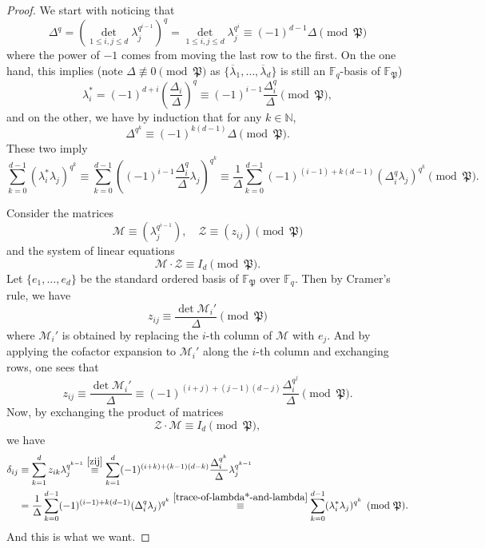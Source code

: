 \documentclass[11pt]{amsart}
\theoremstyle{plain}
\theoremstyle{definition}
\theoremstyle{remark}
\numberwithin{equation}{section}
\newcommand{\NN}{\mathbb{N}}
\newcommand{\FF}{\mathbb{F}}
\newcommand{\Pfk}{\mathfrak{P}}
\newcommand{\Mcal}{\mathcal{M}}
\newcommand{\Zcal}{\mathcal{Z}}
\newcommand{\ovl}{\overline}
\newcommand{\Fq}{\FF_q}
\begin{document}
	\begin{proof}
		We start with noticing that
		$$
		\Delta^q 
		= \left(\det_{1 \leq i,j \leq d} \lambda_j^{q^{i-1}}\right)^q
		= \det_{1 \leq i,j \leq d} \lambda_j^{q^i}
		\equiv (-1)^{d-1} \Delta \pmod{\Pfk}
		$$
		where the power of $-1$ comes from moving the last row to the first.
		On the one hand, this implies (note $\Delta \not\equiv 0 \pmod{\Pfk}$ as $\{\ovl{\lambda}_1,\ldots,\ovl{\lambda}_d\}$ is still an $\Fq$-basis of $\FF_{\Pfk}$)
		$$
		\lambda_i^* 
		= (-1)^{d+i} \left(\frac{\Delta_i}{\Delta}\right)^q
		\equiv (-1)^{i-1} \frac{\Delta_i^q}{\Delta}   \pmod{\Pfk},
		$$
		and on the other, we have by induction that for any $k\in\NN$,
		$$
		\Delta^{q^k} \equiv (-1)^{k(d-1)} \Delta \pmod{\Pfk}.
		$$
		These two imply
		\begin{equation}       \label{trace-of-lambda*-and-lambda}
			\sum_{k=0}^{d-1} (\lambda_i^* \lambda_j)^{q^k}
			\equiv \sum_{k=0}^{d-1} \left( (-1)^{i-1} \frac{\Delta_i^q}{\Delta} \lambda_j \right)^{q^k}
			\equiv \frac{1}{\Delta} \sum_{k=0}^{d-1} (-1)^{(i-1)+k(d-1)} (\Delta_i^q \lambda_j)^{q^k}
			\pmod{\Pfk}.
		\end{equation}
		
		Consider the matrices
		$$
		\Mcal \equiv \left( \lambda_j^{q^{i-1}}  \right),
		\quad  
		\Zcal \equiv (z_{ij})
		\pmod{\Pfk}
		$$
		and the system of linear equations
		\begin{equation}    \label{linear-equations-MZ-I}
			\Mcal \cdot \Zcal \equiv I_d   \pmod{\Pfk}.
		\end{equation}
		Let $\{e_1,\ldots,e_d\}$ be the standard ordered basis of $\FF_\Pfk$ over $\Fq$. Then by Cramer's rule, we have
		$$
		z_{ij} \equiv \frac{\det \Mcal_i'}{\Delta}  \pmod{\Pfk}
		$$
		where $\Mcal_i'$ is obtained by replacing the $i$-th column of $\Mcal$ with $e_j$. And by applying the cofactor expansion to $\Mcal_i'$ along the $i$-th column and exchanging rows, one sees that
		\begin{equation}      \label{zij}
			z_{ij} 
			\equiv \frac{\det \Mcal_i'}{\Delta}  
			\equiv (-1)^{(i+j)+(j-1)(d-j)} \frac{\Delta_i^{q^j}}{\Delta}
			\pmod{\Pfk}.
		\end{equation}
		Now, by exchanging the product of matrices
		$$
		\Zcal \cdot \Mcal \equiv I_d  \pmod{\Pfk},
		$$
		we have
		\begin{align*}
			\delta_{ij} 
			&\equiv \sum_{k=1}^d z_{ik} \lambda_j^{q^{k-1}}
			\overset{\eqref{zij}}{\equiv} \sum_{k=1}^d (-1)^{(i+k)+(k-1)(d-k)} \frac{\Delta_i^{q^k}}{\Delta} \lambda_j^{q^{k-1}}    \\
			&= \frac{1}{\Delta} \sum_{k=0}^{d-1} (-1)^{(i-1)+k(d-1)} (\Delta_i^q \lambda_j)^{q^k}
			\overset{\eqref{trace-of-lambda*-and-lambda}}{\equiv} \sum_{k=0}^{d-1} (\lambda_i^* \lambda_j)^{q^k}  \pmod{\Pfk}.
		\end{align*}
		And this is what we want.
	\end{proof}
	
\end{document}
